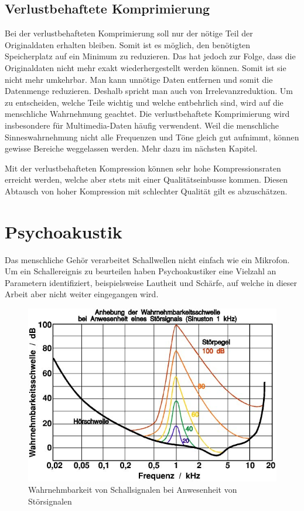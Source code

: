 \begin{refsection}
\subsection{Verlustbehaftete Komprimierung}
Bei der verlustbehafteten Komprimierung soll nur der nötige Teil der Originaldaten erhalten bleiben.
Somit ist es möglich, den benötigten Speicherplatz auf ein Minimum zu reduzieren.
Das hat jedoch zur Folge, dass die Originaldaten nicht mehr exakt wiederhergestellt werden können. 
Somit ist sie nicht mehr umkehrbar.
Man kann unnötige Daten entfernen und somit die Datenmenge reduzieren.
Deshalb spricht man auch von Irrelevanzreduktion.
Um zu entscheiden, welche Teile wichtig und welche entbehrlich sind, wird auf die menschliche Wahrnehmung geachtet.
Die verlustbehaftete Komprimierung wird insbesondere für Multimedia-Daten häufig verwendent.
Weil die menschliche Sinneswahrnehmung nicht alle Frequenzen und Töne gleich gut aufnimmt, können gewisse Bereiche weggelassen werden.
Mehr dazu im nächsten Kapitel.

Mit der verlustbehafteten Kompression können sehr hohe Kompressionsraten erreicht werden, welche aber stets mit einer Qualitätseinbusse kommen.
Diesen Abtausch von hoher Kompression mit schlechter Qualität gilt es abzuschätzen.

\section{Psychoakustik}
Das menschliche Gehör verarbeitet Schallwellen nicht einfach wie ein Mikrofon.
Um ein Schallereignis zu beurteilen haben Psychoakustiker eine Vielzahl an Parametern identifiziert, beispielsweise Lautheit und Schärfe, auf welche in dieser Arbeit aber nicht weiter eingegangen wird.

\begin{figure}
	\centering
	\includegraphics[width=0.6\linewidth]{papers/compress/Bilder/Akustik_Mithoerschwelle2}
	\caption{Wahrnehmbarkeit von Schallsignalen bei Anwesenheit von Störsignalen \cite{skript:Akustik2}}
	\label{fig:Wahrnehmbarkeitsschwelle}
\end{figure}


\end{refsection}
